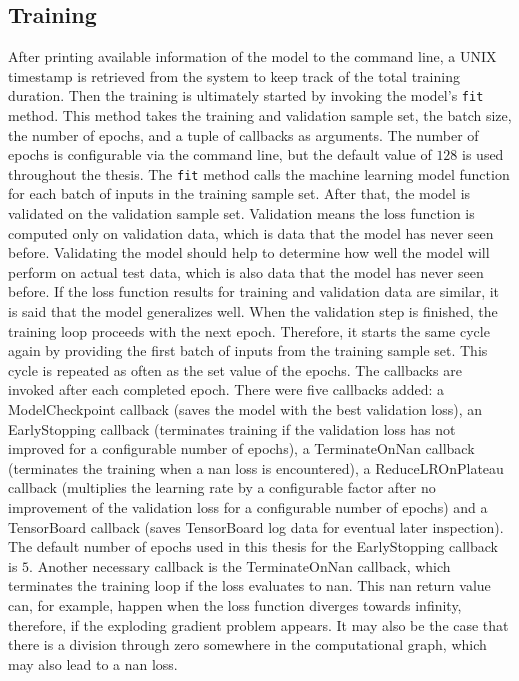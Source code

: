 \documentclass[draft,final]{vutinfth} %
\begin{document}
\subsection{Training}
After printing available information of the model to the command line, a UNIX timestamp is retrieved from the system to keep track of the total training duration.
Then the training is ultimately started by invoking the model's \texttt{fit} method. This method takes the training and validation sample set, the batch size, the number of epochs, and a tuple of callbacks as arguments.
The number of epochs is configurable via the command line, but the default value of $128$ is used throughout the thesis.
The \texttt{fit} method calls the machine learning model function for each batch of inputs in the training sample set. After that, the model is validated on the validation sample set.
Validation means the loss function is computed only on validation data, which is data that the model has never seen before.
Validating the model should help to determine how well the model will perform on actual test data, which is also data that the model has never seen before.
If the loss function results for training and validation data are similar, it is said that the model generalizes well.
When the validation step is finished, the training loop proceeds with the next epoch. Therefore, it starts the same cycle again by providing the first batch of inputs from the training sample set.
This cycle is repeated as often as the set value of the epochs.
The callbacks are invoked after each completed epoch. There were five callbacks added: a ModelCheckpoint callback (saves the model with the best validation loss), an EarlyStopping callback (terminates training if the validation loss has not improved for a configurable number of epochs), a TerminateOnNan callback (terminates the training when a nan loss is encountered), a ReduceLROnPlateau callback (multiplies the learning rate by a configurable factor after no improvement of the validation loss for a configurable number of epochs) and a TensorBoard callback (saves TensorBoard log data for eventual later inspection).
The default number of epochs used in this thesis for the EarlyStopping callback is $5$.
Another necessary callback is the TerminateOnNan callback, which terminates the training loop if the loss evaluates to nan.
This nan return value can, for example, happen when the loss function diverges towards infinity, therefore, if the exploding gradient problem appears.
It may also be the case that there is a division through zero somewhere in the computational graph, which may also lead to a nan loss.
\end{document}
